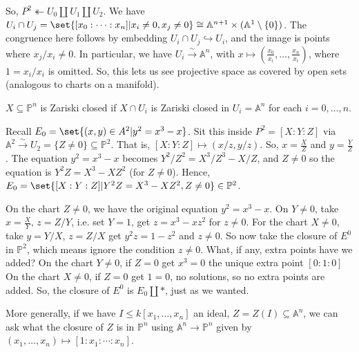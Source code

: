 \documentclass{article}
\newcommand{\A}{\mathbb{A}}
\newcommand{\proj}{\mathbb{P}}
\begin{document}



So, $P^2 \twoheadleftarrow U_0 \amalg U_1 \amalg U_2$.
We have $U_i \cap U_j = \set{[x_0:\dotsm:x_n] | x_i \neq 0, x_j \neq 0} \cong \A^{n+1} \times (\A^1 \setminus \{0\})$.
The congruence here follows by embedding $U_i \cap U_j \hookrightarrow U_i$, and the image is points where $x_j/x_i \neq 0$.
In particular, we have $U_i \xrightarrow{\sim} \A^n$, with $x \mapsto (\frac{x_0}{x_i}, \dotsc, \frac{x_n}{x_i})$, where $1=x_i/x_i$ is omitted.
So, this lets us see projective space as covered by open sets (analogous to charts on a manifold).
\begin{defi}
    $X \subseteq \proj^n$ is Zariski closed if $X \cap U_i$ is Zariski closed in $U_i=\A^n$ for each $i=0, \dotsc, n$.
\end{defi}
Recall $E_0 = \set{(x, y) \in A^2 | y^2 = x^3 - x}$. Sit this inside $P^2 = [X:Y:Z]$ via $\A^2 \xrightarrow{\sim} U_2 = \{Z \neq 0\} \subseteq \proj^2$.
That is, $[X:Y:Z] \mapsto (x/z, y/z)$.
So, $x = \frac{X}{Z}$ and $y=\frac{Y}{Z}$. The equation $y^2 = x^3 - x$ becomes $Y^2/Z^2 = X^3 / Z^3 - X/Z$, and $Z \neq 0$ so the equation is $Y^2 Z = X^3 - XZ^2$ (for $Z \neq 0$).
Hence, $E_0 = \set{[X:Y:Z] | Y^2 Z = X^3 - X Z^2, Z \neq 0} \in \proj^2$.

On the chart $Z \neq 0$, we have the original equation $y^2 = x^3 - x$.
On $Y \neq 0$, take $x = \frac{X}{Y}$, $z = Z/Y$, i.e. set $Y=1$, get $z = x^3 - xz^2$ for $z \neq 0$.
For the chart $X \neq 0$, take $y = Y/X$, $z = Z/X$ get $y^2 z = 1 - z^2$ and $z \neq 0$.
So now take the closure of $E^0$ in $\proj^2$, which means ignore the condition $z \neq 0$. What, if any, extra points have we added?
On the chart $Y \neq 0$, if $Z = 0$ get $x^3 = 0$ the unique extra point $[0:1:0]$ %
On the chart $X \neq 0$, if $Z=0$ get $1 = 0$, no solutions, so no extra points are added.
So, the closure of $E^0$ is $E_0 \amalg *$, just as we wanted.

More generally, if we have $I \leq k[x_1, \dotsc, x_n]$ an ideal, $Z = Z(I) \subseteq \A^n$, we can ask what the closure of $Z$ is in $\proj^n$ using $\A^n \to \proj^n$ given by $(x_1, \dotsc, x_n) \mapsto [1:x_1:\dotsm:x_n]$.
\end{document}
